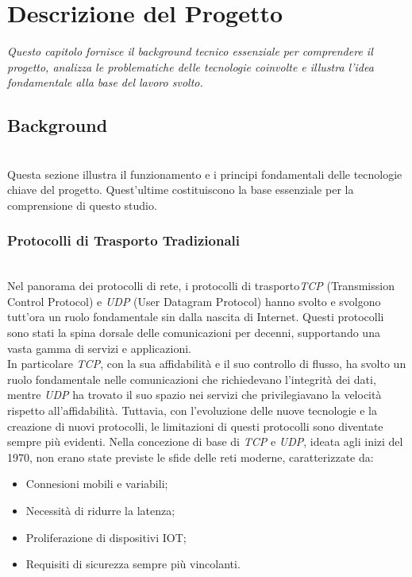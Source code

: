\chapter{Descrizione del Progetto}
\label{cap:descrizione}

\textit{\indent Questo capitolo fornisce il background tecnico essenziale per comprendere il progetto, analizza le problematiche delle tecnologie coinvolte e illustra l'idea fondamentale alla base del lavoro svolto.}

\section{Background}

~\\
\indent Questa sezione illustra il funzionamento e i principi fondamentali delle tecnologie chiave del progetto.
Quest'ultime costituiscono la base essenziale per la comprensione di questo studio. 

\subsection{Protocolli di Trasporto Tradizionali}
~\\
\indent Nel panorama dei \gls{protocolli di rete}\glsfirstoccur, i \gls{protocolli di trasporto}\glsfirstoccur \emph{TCP} (Transmission Control Protocol) e \emph{UDP} (User Datagram Protocol) hanno svolto e svolgono tutt'ora un ruolo fondamentale sin dalla nascita di Internet.
Questi protocolli sono stati la spina dorsale delle comunicazioni per decenni, supportando una vasta gamma di servizi e applicazioni.\\
In particolare \emph{TCP}, con la sua affidabilità e il suo controllo di flusso, ha svolto un ruolo fondamentale nelle comunicazioni che richiedevano l'integrità dei dati, mentre \emph{UDP} ha trovato il suo spazio nei servizi che privilegiavano la velocità rispetto all'affidabilità. 
Tuttavia, con l'evoluzione delle nuove tecnologie e la creazione di nuovi protocolli, le limitazioni di questi protocolli sono diventate sempre più evidenti. Nella concezione di base di \emph{TCP} e \emph{UDP}, ideata agli inizi del 1970, non erano state previste le sfide delle reti moderne, 
caratterizzate da:  
\begin{itemize}
    \item Connesioni mobili e variabili;
    
    \item Necessità di ridurre la latenza;
    
    \item Proliferazione di dispositivi IOT;
     
    \item Requisiti di sicurezza sempre più vincolanti.
\end{itemize}

